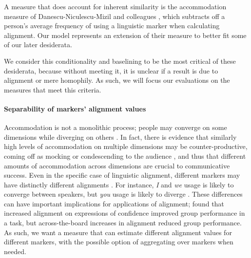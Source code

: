 \documentclass{acm_proc_article-sp}
\begin{document}
A measure that does account for inherent similarity is the accommodation measure of Danescu-Niculescu-Mizil and colleagues \cite{DNMGamonDumais2011,DNMLee2011,DNMEtAl2012}, which subtracts off a person's average frequency of using a linguistic marker when calculating alignment.  Our model represents an extension of their measure to better fit some of our later desiderata.

We consider this conditionality and baselining to be the most critical of these desiderata, because without meeting it, it is unclear if a result is due to alignment or mere homophily.  As such, we will focus our evaluations on the measures that meet this criteria.

\paragraph{Separability of markers' alignment values} Accommodation is not a monolithic process; people may converge on some dimensions while diverging on others \cite{BilousKrauss1988,Ferrara1991}. In fact, there is evidence that similarly high levels of accommodation on multiple dimensions may be counter-productive, coming off as mocking or condescending to the audience \cite{GilesSmith1979,GilesCouplandCoupland1991}, and thus that different amounts of accommodation across dimensions are crucial to communicative success. Even in the specific case of linguistic alignment, different markers may have distinctly different alignments \cite{DNMGamonDumais2011,IrelandEtAl2011}. For instance, \textit{I} and \textit{we} usage is likely to converge between speakers, but \textit{you} usage is likely to diverge \cite{NiederhofferPennebaker2002?,GonzalesHancockPennebaker2010?}. These differences can have important implications for applications of alignment; \cite{FusaroliEtAl2012} found that increased alignment on expressions of confidence improved group performance in a task, but across-the-board increases in alignment reduced group performance.  As such, we want a measure that can estimate different alignment values for different markers, with the possible option of aggregating over markers when needed.
\end{document}

